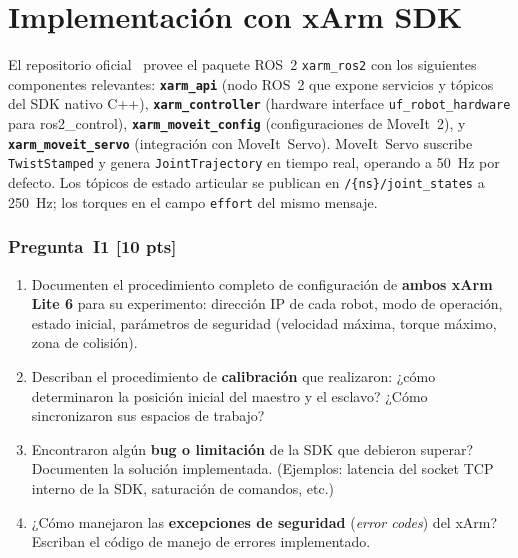 \documentclass[journal,10pt,twoside]{IEEEtran}
\newcommand{\pts}[1]{\textcolor{tec_red}{\textbf{[#1 pts]}}}
\begin{document}
\section{Implementación con xArm SDK}
\label{sec:implementation}

\begin{theorybox}
  El repositorio oficial~\cite{xarm_ros2} provee el paquete ROS~2
  \texttt{xarm\_ros2} con los siguientes componentes relevantes:
  \textbf{\texttt{xarm\_api}} (nodo ROS~2 que expone servicios y tópicos
  del SDK nativo C++), \textbf{\texttt{xarm\_controller}} (hardware
  interface \texttt{uf\_robot\_hardware} para ros2\_control),
  \textbf{\texttt{xarm\_moveit\_config}} (configuraciones de MoveIt~2),
  y \textbf{\texttt{xarm\_moveit\_servo}} (integración con MoveIt~Servo).
  MoveIt~Servo suscribe \texttt{TwistStamped} y genera
  \texttt{JointTrajectory} en tiempo real, operando a 50~Hz por defecto.
  Los tópicos de estado articular se publican en
  \texttt{/\{ns\}/joint\_states} a 250~Hz; los torques en el campo
  \texttt{effort} del mismo mensaje.
\end{theorybox}

\subsubsection*{Pregunta~I1 \pts{10}}
\begin{enumerate}[label=(\alph*)]
  \item Documenten el procedimiento completo de configuración de
        \textbf{ambos xArm Lite 6} para su experimento:
        dirección IP de cada robot, modo de operación, estado inicial,
        parámetros de seguridad (velocidad máxima, torque máximo,
        zona de colisión).
  \item Describan el procedimiento de \textbf{calibración} que realizaron:
        ¿cómo determinaron la posición inicial del maestro y el esclavo?
        ¿Cómo sincronizaron sus espacios de trabajo?
  \item Encontraron algún \textbf{bug o limitación} de la SDK que
        debieron superar? Documenten la solución implementada.
        (Ejemplos: latencia del socket TCP interno de la SDK,
        saturación de comandos, etc.)
  \item ¿Cómo manejaron las \textbf{excepciones de seguridad}
        (\textit{error codes}) del xArm? Escriban el código de
        manejo de errores implementado.
\end{enumerate}
\end{document}
